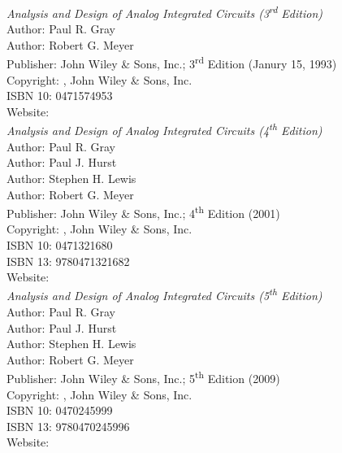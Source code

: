 
\begin{thebibliography}{9}




\emph{Analysis and Design of Analog Integrated Circuits (3\textsuperscript{rd} Edition)}\\
Author: Paul R. Gray\\
Author: Robert G. Meyer\\
Publisher: John Wiley \& Sons, Inc.; 3\textsuperscript{rd} Edition (Janury 15, 1993)\\
Copyright: \textcopyright {}, John Wiley \& Sons, Inc.\\
ISBN 10: 0471574953\\
Website: \\




\emph{Analysis and Design of Analog Integrated Circuits (4\textsuperscript{th} Edition)}\\
Author: Paul R. Gray\\
Author: Paul J. Hurst\\
Author: Stephen H. Lewis\\
Author: Robert G. Meyer\\
Publisher: John Wiley \& Sons, Inc.; 4\textsuperscript{th} Edition (2001)\\
Copyright: \textcopyright {}, John Wiley \& Sons, Inc.\\
ISBN 10: 0471321680\\
ISBN 13: 9780471321682\\
Website: \\




\emph{Analysis and Design of Analog Integrated Circuits (5\textsuperscript{th} Edition)}\\
Author: Paul R. Gray\\
Author: Paul J. Hurst\\
Author: Stephen H. Lewis\\
Author: Robert G. Meyer\\
Publisher: John Wiley \& Sons, Inc.; 5\textsuperscript{th} Edition (2009)\\
Copyright: \textcopyright {}, John Wiley \& Sons, Inc.\\
ISBN 10: 0470245999\\
ISBN 13: 9780470245996\\
Website: \\




\end{thebibliography}
